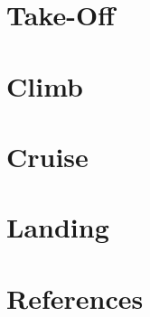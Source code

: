 \documentclass{article}
\begin{document}
\newpage
\section{Take-Off}

\newpage
\section{Climb}

\newpage
\section{Cruise}

\newpage
\section{Landing} 

\newpage
\section{References}
\end{document}
